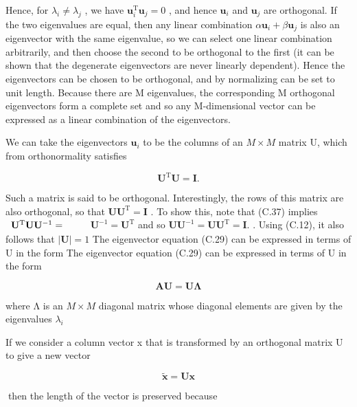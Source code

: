 \documentclass[
  10
]{article}
\begin{document}
Hence, for \(\lambda _ { i } \neq \lambda _ { j }\) , we have
\(\mathbf { u } _ { i } ^ { \mathrm { T } } \mathbf { u } _ { j } = 0\)
, and hence \(\mathbf { u } _ { i }\) and \(\mathbf { u } _ { j }\) are
orthogonal. If the two eigenvalues are equal, then any linear
combination
\(\alpha \mathbf { u } _ { i } + \beta \mathbf { u } _ { j }\) is also
an eigenvector with the same eigenvalue, so we can select one linear
combination arbitrarily, and then choose the second to be orthogonal to
the first (it can be shown that the degenerate eigenvectors are never
linearly dependent). Hence the eigenvectors can be chosen to be
orthogonal, and by normalizing can be set to unit length. Because there
are M eigenvalues, the corresponding M orthogonal eigenvectors form a
complete set and so any M-dimensional vector can be expressed as a
linear combination of the eigenvectors.

We can take the eigenvectors \(\mathbf { u } _ { i }\) to be the columns
of an \(M \times M\) matrix U, which from orthonormality satisfies

\[
\mathbf {U} ^ {\mathrm{T}} \mathbf {U} = \mathbf {I}.\tag{C.37}
\]

Such a matrix is said to be orthogonal. Interestingly, the rows of this
matrix are also orthogonal, so that
\(\mathbf { U } \mathbf { U } ^ { \mathrm { T } } = \mathbf { I }\) . To
show this, note that (C.37) implies
\(\begin{array} { r } { { \bf U } ^ { \mathrm { T } } { \bf U } { \bf U } ^ { - 1 } = \qquad } \end{array}\)
\(\mathbf { U } ^ { - 1 } = \mathbf { U } ^ { \mathrm { T } }\) and so
\(\mathbf { U U } ^ { - 1 } = \mathbf { U U } ^ { \mathrm { T } } = \mathbf { I } .\)
. Using (C.12), it also follows that \(| \mathbf { U } | = 1\) The
eigenvector equation (C.29) can be expressed in terms of U in the form
The eigenvector equation (C.29) can be expressed in terms of U in the
form

\[
\mathbf {A} \mathbf {U} = \mathbf {U} \boldsymbol {\Lambda}\tag{C.38}
\]

where Λ is an \(M \times M\) diagonal matrix whose diagonal elements are
given by the eigenvalues \(\lambda _ { i }\)

If we consider a column vector x that is transformed by an orthogonal
matrix U to give a new vector

\[
\widetilde {\mathbf {x}} = \mathbf {U} \mathbf {x}\tag{C.39}
\]

then the length of the vector is preserved because
\end{document}
